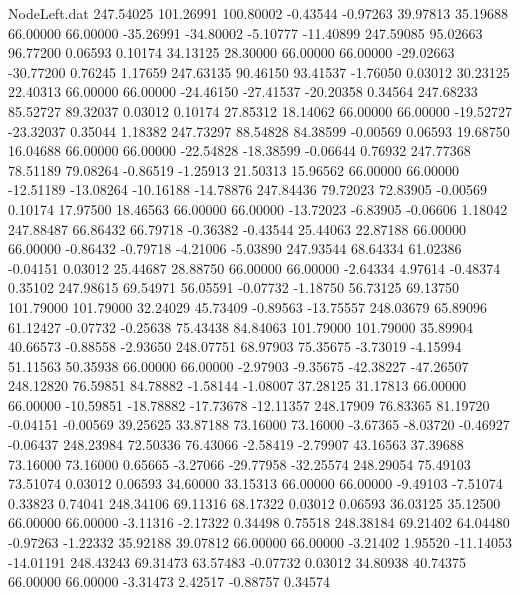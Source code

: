 \begin{filecontents}{NodeLeft.dat}
 247.54025  101.26991  100.80002    -0.43544   -0.97263   39.97813   35.19688   66.00000   66.00000  -35.26991  -34.80002   -5.10777  -11.40899
 247.59085   95.02663   96.77200     0.06593    0.10174   34.13125   28.30000   66.00000   66.00000  -29.02663  -30.77200    0.76245    1.17659
 247.63135   90.46150   93.41537    -1.76050    0.03012   30.23125   22.40313   66.00000   66.00000  -24.46150  -27.41537  -20.20358    0.34564
 247.68233   85.52727   89.32037     0.03012    0.10174   27.85312   18.14062   66.00000   66.00000  -19.52727  -23.32037    0.35044    1.18382
 247.73297   88.54828   84.38599    -0.00569    0.06593   19.68750   16.04688   66.00000   66.00000  -22.54828  -18.38599   -0.06644    0.76932
 247.77368   78.51189   79.08264    -0.86519   -1.25913   21.50313   15.96562   66.00000   66.00000  -12.51189  -13.08264  -10.16188  -14.78876
 247.84436   79.72023   72.83905    -0.00569    0.10174   17.97500   18.46563   66.00000   66.00000  -13.72023   -6.83905   -0.06606    1.18042
 247.88487   66.86432   66.79718    -0.36382   -0.43544   25.44063   22.87188   66.00000   66.00000   -0.86432   -0.79718   -4.21006   -5.03890
 247.93544   68.64334   61.02386    -0.04151    0.03012   25.44687   28.88750   66.00000   66.00000   -2.64334    4.97614   -0.48374    0.35102
 247.98615   69.54971   56.05591    -0.07732   -1.18750   56.73125   69.13750  101.79000  101.79000   32.24029   45.73409   -0.89563  -13.75557
 248.03679   65.89096   61.12427    -0.07732   -0.25638   75.43438   84.84063  101.79000  101.79000   35.89904   40.66573   -0.88558   -2.93650
 248.07751   68.97903   75.35675    -3.73019   -4.15994   51.11563   50.35938   66.00000   66.00000   -2.97903   -9.35675  -42.38227  -47.26507
 248.12820   76.59851   84.78882    -1.58144   -1.08007   37.28125   31.17813   66.00000   66.00000  -10.59851  -18.78882  -17.73678  -12.11357
 248.17909   76.83365   81.19720    -0.04151   -0.00569   39.25625   33.87188   73.16000   73.16000   -3.67365   -8.03720   -0.46927   -0.06437
 248.23984   72.50336   76.43066    -2.58419   -2.79907   43.16563   37.39688   73.16000   73.16000    0.65665   -3.27066  -29.77958  -32.25574
 248.29054   75.49103   73.51074     0.03012    0.06593   34.60000   33.15313   66.00000   66.00000   -9.49103   -7.51074    0.33823    0.74041
 248.34106   69.11316   68.17322     0.03012    0.06593   36.03125   35.12500   66.00000   66.00000   -3.11316   -2.17322    0.34498    0.75518
 248.38184   69.21402   64.04480    -0.97263   -1.22332   35.92188   39.07812   66.00000   66.00000   -3.21402    1.95520  -11.14053  -14.01191
 248.43243   69.31473   63.57483    -0.07732    0.03012   34.80938   40.74375   66.00000   66.00000   -3.31473    2.42517   -0.88757    0.34574

\end{filecontents}
